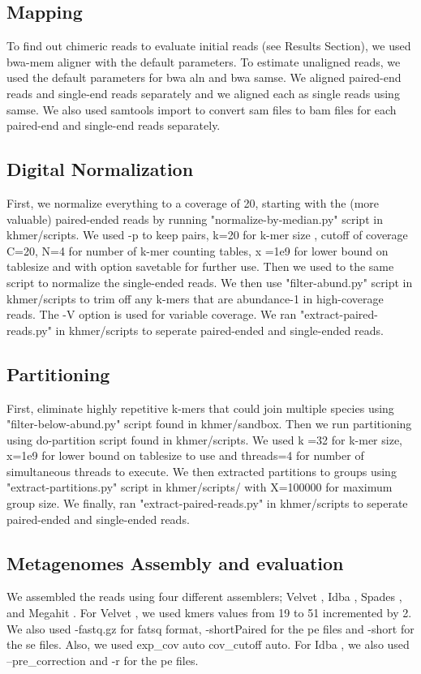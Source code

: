 \subsection*{Mapping}

To find out chimeric reads to evaluate initial reads (see Results Section), we used bwa-mem aligner with the default parameters.  To estimate unaligned reads, we used the default parameters for bwa aln and bwa samse. We aligned paired-end reads and single-end reads separately and we aligned each as single reads using samse. We also used samtools import to convert  sam files to bam files for each paired-end and single-end reads separately. 


\subsection*{Digital Normalization} 
First, we normalize everything to a coverage of 20, starting with the (more valuable) paired-ended reads by running "normalize-by-median.py" script in khmer/scripts. We used -p to keep pairs, k=20 for k-mer size , cutoff of coverage C=20, N=4 for number of k-mer counting tables, x =1e9 for lower bound on tablesize  and  with option savetable for further use. Then we used to the same script to normalize the single-ended reads. We then use "filter-abund.py" script in khmer/scripts to trim off any k-mers that are abundance-1 in high-coverage reads. The -V option is used for variable coverage. We ran "extract-paired-reads.py" in khmer/scripts to seperate paired-ended and single-ended reads. 

\subsection*{Partitioning} 
First, eliminate highly repetitive k-mers that could join multiple species using "filter-below-abund.py" script found in khmer/sandbox.  Then we run partitioning using do-partition script found in khmer/scripts. We used k =32 for k-mer size, x=1e9  for lower bound on tablesize to use and threads=4 for number of simultaneous threads to execute. 
We then extracted partitions to groups using "extract-partitions.py" script in khmer/scripts/ with X=100000 for maximum group size. We finally, ran "extract-paired-reads.py" in khmer/scripts to seperate paired-ended and single-ended reads. 

\subsection*{Metagenomes Assembly and evaluation}
We assembled the reads using four different assemblers; Velvet \cite{velvet}, Idba \cite{idba}, Spades \cite{spades}, and Megahit \cite{megahit}. For  Velvet \cite{velvet}, we used kmers values from 19 to 51 incremented by 2. We also used -fastq.gz for fatsq format,  -shortPaired for the pe files and -short for the se files. Also, we used \-exp\_cov auto \-cov\_cutoff auto.  For Idba \cite{idba},  we also used  --pre\_correction and -r for the pe files. 


